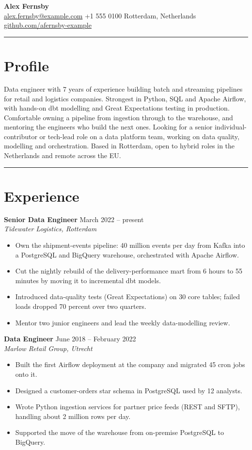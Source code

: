 \documentclass[10pt,a4paper]{article}
\newcommand{\sectionrule}{\par\vspace{2pt}\hrule\vspace{6pt}}
\newcommand{\entry}[3]{\textbf{#1} \hfill #3\\ \emph{#2}\vspace{-2pt}}
\begin{document}
{\LARGE\textbf{Alex Fernsby}}\\[4pt]
\href{mailto:alex.fernsby@example.com}{alex.fernsby@example.com} \quad +1 555 0100 \quad Rotterdam, Netherlands \quad
\href{https://github.com/afernsby-example}{github.com/afernsby-example}
\sectionrule

\section*{Profile}
Data engineer with 7 years of experience building batch and streaming pipelines for retail and logistics
companies. Strongest in Python, SQL and Apache Airflow, with hands-on dbt modelling and Great Expectations
testing in production. Comfortable owning a pipeline from ingestion through to the warehouse, and
mentoring the engineers who build the next ones. Looking for a senior individual-contributor or tech-lead
role on a data platform team, working on data quality, modelling and orchestration. Based in Rotterdam,
open to hybrid roles in the Netherlands and remote across the EU.
\sectionrule

\section*{Experience}

\entry{Senior Data Engineer}{Tidewater Logistics, Rotterdam}{March 2022 -- present}
\begin{itemize}\setlength\itemsep{4pt}
  \item Own the shipment-events pipeline: 40 million events per day from Kafka into a PostgreSQL and
    BigQuery warehouse, orchestrated with Apache Airflow.
  \item Cut the nightly rebuild of the delivery-performance mart from 6 hours to 55 minutes by moving it
    to incremental dbt models.
  \item Introduced data-quality tests (Great Expectations) on 30 core tables; failed loads dropped 70
    percent over two quarters.
  \item Mentor two junior engineers and lead the weekly data-modelling review.
\end{itemize}
\vspace{8pt}

\entry{Data Engineer}{Marlow Retail Group, Utrecht}{June 2018 -- February 2022}
\begin{itemize}\setlength\itemsep{4pt}
  \item Built the first Airflow deployment at the company and migrated 45 cron jobs onto it.
  \item Designed a customer-orders star schema in PostgreSQL used by 12 analysts.
  \item Wrote Python ingestion services for partner price feeds (REST and SFTP), handling about 2 million
    rows per day.
  \item Supported the move of the warehouse from on-premise PostgreSQL to BigQuery.
\end{itemize}
\vspace{8pt}
\end{document}
